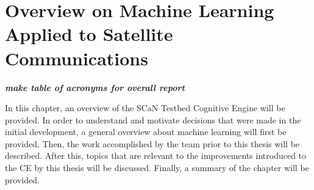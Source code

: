 \documentclass[11pt]{report}
\begin{document}
	
	\chapter{Overview on Machine Learning Applied to Satellite Communications}
	\par \textbf{\textit{make table of acronyms for overall report}}
	\par In this chapter, an overview of the SCaN Testbed Cognitive Engine will be provided. In order to understand and motivate decisions that were made in the initial development, a general overview about machine learning will first be provided. Then, the work accomplished by the team prior to this thesis will be described. After this, topics that are relevant to the improvements introduced to the CE by this thesis will be discussed. Finally, a summary of the chapter will be provided.
\end{document}
